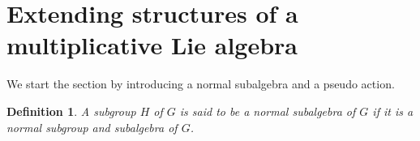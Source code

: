 \documentclass[10 pt,oneside,reqno,a4paper]{amsart}
\newtheorem{definition}{Definition}[section]
\numberwithin{equation}{section}
\begin{document}



\section{Extending structures of a multiplicative Lie algebra}
We start the section by introducing a normal subalgebra and a pseudo action. 
\begin{definition}
    A subgroup $H$ of $G$ is said to be a normal subalgebra of $ G$ if it is a normal subgroup and subalgebra of $G$.
\end{definition}
\end{document}
